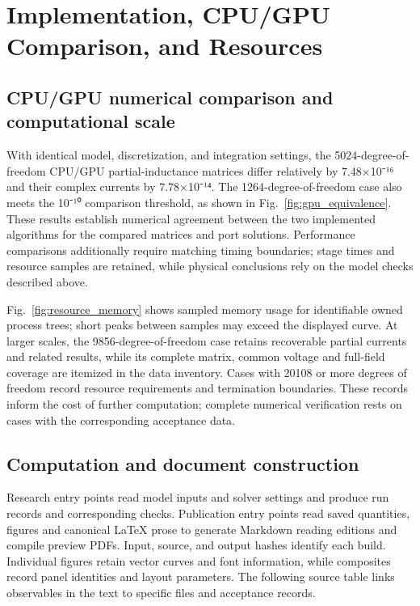 \section{Implementation, CPU/GPU Comparison, and Resources}
\label{chapter:10}

\hypertarget{10.compute.heading}{}
\subsection{CPU/GPU numerical comparison and computational scale}

\hypertarget{10.compute.p1}{}
With identical model, discretization, and integration settings, the 5024-degree-of-freedom CPU/GPU partial-inductance matrices differ relatively by 7.48×10⁻¹⁶ and their complex currents by 7.78×10⁻¹⁴. The 1264-degree-of-freedom case also meets the 10⁻¹⁰ comparison threshold, as shown in Fig.~\ref{fig:gpu_equivalence}. These results establish numerical agreement between the two implemented algorithms for the compared matrices and port solutions. Performance comparisons additionally require matching timing boundaries; stage times and resource samples are retained, while physical conclusions rely on the model checks described above.

\hypertarget{10.compute.p2}{}
Fig.~\ref{fig:resource_memory} shows sampled memory usage for identifiable owned process trees; short peaks between samples may exceed the displayed curve. At larger scales, the 9856-degree-of-freedom case retains recoverable partial currents and related results, while its complete matrix, common voltage and full-field coverage are itemized in the data inventory. Cases with 20108 or more degrees of freedom record resource requirements and termination boundaries. These records inform the cost of further computation; complete numerical verification rests on cases with the corresponding acceptance data.

\hypertarget{10.workflow.heading}{}
\subsection{Computation and document construction}

\hypertarget{10.workflow.p1}{}
Research entry points read model inputs and solver settings and produce run records and corresponding checks. Publication entry points read saved quantities, figures and canonical LaTeX prose to generate Markdown reading editions and compile preview PDFs. Input, source, and output hashes identify each build. Individual figures retain vector curves and font information, while composites record panel identities and layout parameters. The following source table links observables in the text to specific files and acceptance records.

